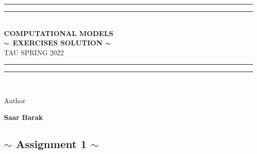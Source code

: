 \documentclass[12pt]{article}
\newlength{\drop}
\begin{document}
  \begin{titlepage}
    \textheight
    \centering
    \vspace*{\baselineskip}
    \rule{\textwidth}{3.6pt}\vspace*{-\baselineskip}\vspace*{6pt}
    \rule{\textwidth}{1.4pt}\\[\baselineskip]
    {\huge\textbf{COMPUTATIONAL MODELS \\ $\thicksim$ EXERCISES SOLUTION    $\thicksim$ }\\[0.3\baselineskip]{\Large TAU  SPRING 2022} }\\[0.4\baselineskip]
    \rule{\textwidth}{3.6pt}\vspace*{-\baselineskip}\vspace{6pt}
    \rule{\textwidth}{1.6pt}\\[\baselineskip]
    \scshape    
    
    \vspace*{4\baselineskip}
    Author \\[\baselineskip]
    {\Large \textbf{Saar Barak} \par}
    \vspace*{5\baselineskip}
    \pagebreak
    \tableofcontents
    \par
  \end{titlepage}
  
  
\begin{center}
\section{$\sim$ Assignment 1 $\sim$}
\end{center}
\end{document}

